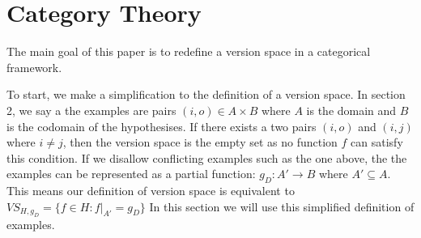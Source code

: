 \documentclass{article}
\theoremstyle{definition}
\begin{document}
\section{Category Theory}
The main goal of this paper is to redefine a version space in a categorical framework.

To start, we make a simplification to the definition of a version space. In section 2, we say a the examples are pairs $(i, o) \in A\times B$ where $A$ is the domain and $B$ is the codomain of the hypothesises. If there exists a two pairs $(i, o)$ and $(i, j)$ where $i\neq j$, then the version space is the empty set as no function $f$ can satisfy this condition. If we disallow conflicting examples such as the one above, the the examples can be represented as a partial function: $g_D : A' \rightarrow B$ where $A' \subseteq A$. This means our definition of version space is equivalent to $VS_{H,g_D} = \{f \in H : f|_{A'} = g_D\}$ In this section we will use this simplified definition of examples.
\end{document}
